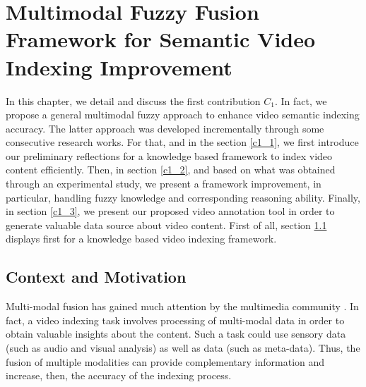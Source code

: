 \chapter{Multimodal Fuzzy Fusion Framework for Semantic Video Indexing Improvement}
\label{c1}


	

	In this chapter, we detail and discuss the first contribution $C_{1}$. In fact, we propose a general 
	multimodal fuzzy approach to enhance video semantic indexing accuracy. The latter approach was developed 
	incrementally through some consecutive research works. For that, and in the section \ref{c1_1}, 
	we first introduce our preliminary reflections for a knowledge based framework to index video content 
	efficiently. Then, in section \ref{c1_2}, and based on what was obtained through an experimental study, 
	we present a framework improvement, in particular, handling fuzzy knowledge and corresponding reasoning 
	ability. Finally, in section \ref{c1_3}, we present our proposed video annotation tool in order to generate 
	valuable data source about video content. First of all, section \ref{c1_0} displays first 
	for a knowledge based video indexing framework.

	\section{Context and Motivation}
	\label{c1_0}

	Multi-modal fusion has gained much attention by the multimedia community \citep{Atrey2010}. 
	In fact, a video indexing task involves processing of multi-modal data in order to obtain valuable 
	insights about the content. Such a task could use sensory data (such as audio and visual analysis) 
	as well as  data (such as meta-data). Thus, the fusion of multiple modalities can provide 
	complementary information and increase, then, the accuracy of the indexing process.
	
